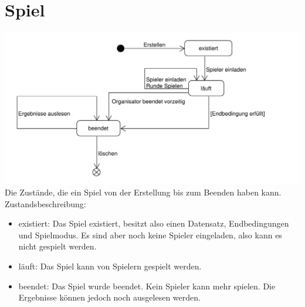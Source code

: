 \documentclass[a4paper]{scrreprt}
\begin{document}
	\section{Spiel}
	\label{fig:Spiel_State}
	\includegraphics[width=\textwidth]{img/Spiel_Zustand.pdf}
	Die Zustände, die ein Spiel von der Erstellung bis zum Beenden haben kann.
	Zustandsbeschreibung:
	\begin{itemize}
		\item existiert: Das Spiel existiert, besitzt also einen Datensatz, Endbedingungen und Spielmodus. Es sind aber noch keine Spieler eingeladen, also kann es nicht gespielt werden.
		\item läuft: Das Spiel kann von Spielern gespielt werden.
		\item beendet: Das Spiel wurde beendet. Kein Spieler kann mehr spielen. Die Ergebnisse können jedoch noch ausgelesen werden.
	\end{itemize}
\end{document}
